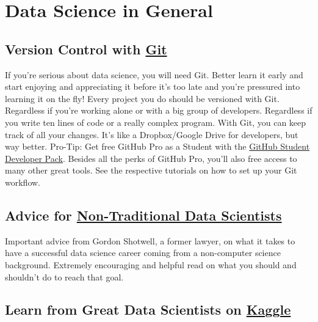 \documentclass[
  11pt,
]{book}
\begin{document}
\hypertarget{data-science-in-general}{%
\section{Data Science in General}\label{data-science-in-general}}

\hypertarget{version-control-with-git}{%
\subsection*{\texorpdfstring{Version Control with \href{https://github.com/}{Git}}{Version Control with Git}}\label{version-control-with-git}}

If you're serious about data science, you will need Git. Better learn it early and start enjoying and appreciating it before it's too late and you're pressured into learning it on the fly! Every project you do should be versioned with Git. Regardless if you're working alone or with a big group of developers. Regardless if you write ten lines of code or a really complex program. With Git, you can keep track of all your changes. It's like a Dropbox/Google Drive for developers, but way better. Pro-Tip: Get free GitHub Pro as a Student with the \href{https://education.github.com/pack}{GitHub Student Developer Pack}. Besides all the perks of GitHub Pro, you'll also free access to many other great tools. See the respective tutorials on how to set up your Git workflow.

\hypertarget{advice-for-non-traditional-data-scientists}{%
\subsection*{\texorpdfstring{Advice for \href{https://blog.shotwell.ca/posts/learning_data_science/}{Non-Traditional Data Scientists}}{Advice for Non-Traditional Data Scientists}}\label{advice-for-non-traditional-data-scientists}}

Important advice from Gordon Shotwell, a former lawyer, on what it takes to have a successful data science career coming from a non-computer science background. Extremely encouraging and helpful read on what you should and shouldn't do to reach that goal.

\hypertarget{learn-from-great-data-scientists-on-kaggle}{%
\subsection*{\texorpdfstring{Learn from Great Data Scientists on \href{https://www.kaggle.com/}{Kaggle}}{Learn from Great Data Scientists on Kaggle}}\label{learn-from-great-data-scientists-on-kaggle}}
\end{document}
